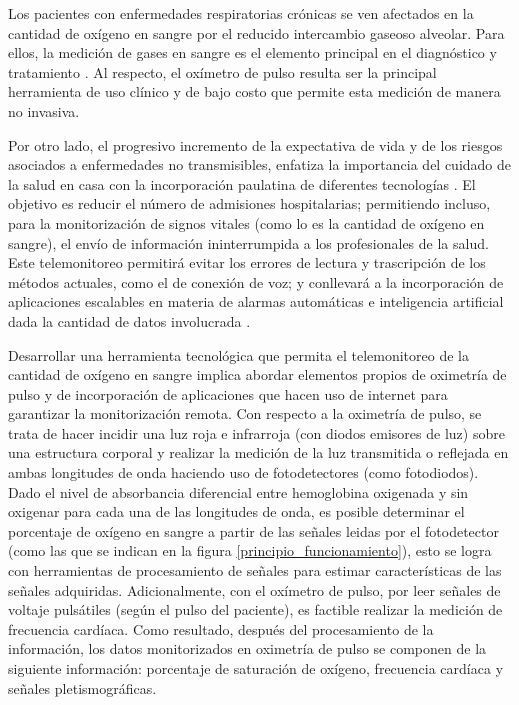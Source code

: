 \documentclass[journal]{IEEEtran}
\begin{document}
Los pacientes con enfermedades respiratorias crónicas se ven afectados en la cantidad de oxígeno en sangre por el reducido intercambio gaseoso alveolar. Para ellos, la medición de gases en sangre es el elemento principal en el diagnóstico y tratamiento \cite{A_webster_spo2}.  Al respecto, el oxímetro de pulso resulta ser la principal herramienta de uso clínico y de bajo costo que permite esta medición de manera no invasiva.

Por otro lado, el progresivo incremento de la expectativa de vida y de los riesgos asociados a enfermedades no transmisibles, enfatiza la importancia del cuidado de la salud en casa con la incorporación paulatina de diferentes tecnologías \cite{A_webster_home_care}. El objetivo es reducir el número de admisiones hospitalarias; permitiendo incluso, para la monitorización de signos vitales (como lo es la cantidad de oxígeno en sangre), el envío de información ininterrumpida a los profesionales de la salud. Este telemonitoreo permitirá evitar los errores de lectura y trascripción de los métodos actuales, como el de conexión de voz; y conllevará  a la incorporación de aplicaciones escalables en materia de alarmas automáticas e inteligencia artificial dada la cantidad de datos involucrada \cite{A_telemedicina}.

Desarrollar una herramienta tecnológica que permita el telemonitoreo de la cantidad de oxígeno en sangre implica abordar elementos propios de oximetría de pulso y de incorporación de aplicaciones que hacen uso de internet para garantizar la monitorización remota. Con respecto a la oximetría de pulso, se trata de hacer incidir una luz roja e infrarroja (con diodos emisores de luz) sobre una estructura corporal y realizar la medición de la luz transmitida o reflejada en ambas longitudes de onda haciendo uso de fotodetectores (como fotodiodos). Dado el nivel de absorbancia diferencial entre hemoglobina oxigenada y sin oxigenar para cada una de las longitudes de onda, es posible determinar el porcentaje de oxígeno en sangre a partir de las señales leidas por el fotodetector (como  las que se indican en la figura \ref{principio_funcionamiento}), esto se logra con herramientas de procesamiento de señales para estimar características de las señales adquiridas.  Adicionalmente, con el oxímetro de pulso, por leer señales de voltaje pulsátiles (según el pulso del paciente), es factible realizar la medición de frecuencia cardíaca. Como resultado, después del procesamiento de la información,  los datos monitorizados en oximetría de pulso se componen de la siguiente información: porcentaje de saturación de oxígeno, frecuencia cardíaca y señales pletismográficas.
\end{document}

